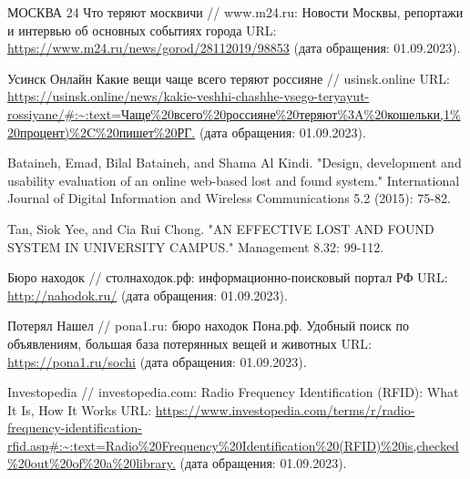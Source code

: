 \documentclass{mirea}
\begin{document}
\addtocounter{page}{2}

\tableofcontents















\begin{thebibliography}{99\kern\bibindent}
	 МОСКВА 24 Что теряют москвичи // www.m24.ru: Новости Москвы, репортажи и интервью об основных событиях города URL: \url{https://www.m24.ru/news/gorod/28112019/98853} (дата обращения: 01.09.2023).
	
	 Усинск Онлайн Какие вещи чаще всего теряют россияне // usinsk.online URL: \url{https://usinsk.online/news/kakie-veshhi-chashhe-vsego-teryayut-rossiyane/#:~:text=Чаще%20всего%20россияне%20теряют%3A%20кошельки,1%20процент)%2C%20пишет%20РГ.} (дата обращения: 01.09.2023).
	
	 Bataineh, Emad, Bilal Bataineh, and Shama Al Kindi. "Design, development and usability evaluation of an online web-based lost and found system." International Journal of Digital Information and Wireless Communications 5.2 (2015): 75-82. %
	
	 Tan, Siok Yee, and Cia Rui Chong. "AN EFFECTIVE LOST AND FOUND SYSTEM IN UNIVERSITY CAMPUS." Management 8.32: 99-112. %
	
	
	 Бюро находок // столнаходок.рф: информационно-поисковый портал РФ URL: \url{http://nahodok.ru/} (дата обращения: 01.09.2023).
	
	 Потерял Нашел // pona1.ru: бюро находок Пона.рф. Удобный поиск по объявлениям, большая база потерянных вещей и животных URL: \url{https://pona1.ru/sochi} (дата обращения: 01.09.2023).
	
	 Investopedia // investopedia.com: Radio Frequency Identification (RFID): What It Is, How It Works URL: \url{https://www.investopedia.com/terms/r/radio-frequency-identification-rfid.asp#:~:text=Radio%20Frequency%20Identification%20(RFID)%20is,checked%20out%20of%20a%20library.} (дата обращения: 01.09.2023).
	

\end{thebibliography}
\end{document}
